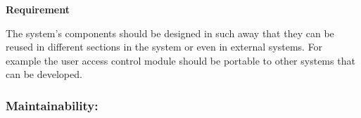 \begin{flushleft}
\vspace{0.1in}

\textbf{Requirement}

The system's components should be designed in such away that they can be reused in different sections in the system or even in external systems. For example the user access control module should be portable to other systems that can be developed.

\end{flushleft}

\vspace{0.1in}

\vspace{0.2in}
\newpage
\subsubsection{Maintainability:}

